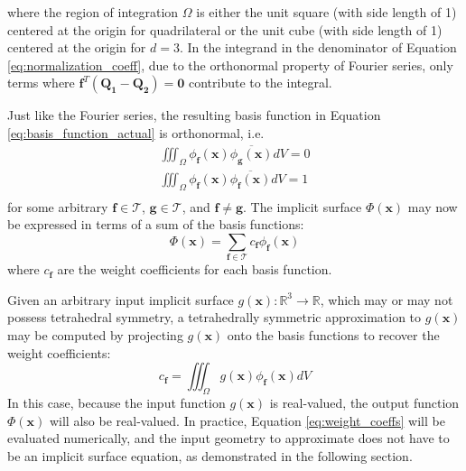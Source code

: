 \documentclass[acmtog]{acmart}
\begin{document}
where the region of integration $\Omega$ is either the unit square (with side length of 1) centered at the origin for quadrilateral  or the unit cube (with side length of 1) centered at the origin for $d = 3$. In the integrand in the denominator of Equation \ref{eq:normalization_coeff}, due to the orthonormal property of Fourier series, only terms where $\mathbf{f}^T (\mathbf{Q_1 - Q_2}) = \mathbf{0}$ contribute to the integral.

Just like the Fourier series, the resulting basis function in Equation \ref{eq:basis_function_actual} is orthonormal, i.e.
%
\begin{equation}
  \begin{split}
    \iiint_{\Omega} \phi_{\mathbf{f}}(\mathbf{x}) \overline{\phi_{\mathbf{g}}(\mathbf{x})} dV = 0 \\
    \iiint_{\Omega} \phi_{\mathbf{f}}(\mathbf{x}) \overline{\phi_{\mathbf{f}}(\mathbf{x})} dV = 1 \\
  \end{split}
\end{equation}
%
for some arbitrary $\mathbf{f} \in \mathcal{T}$, $\mathbf{g} \in \mathcal{T}$, and $\mathbf{f} \neq \mathbf{g}$. The implicit surface $\Phi(\mathbf{x})$ may now be expressed in terms of a sum of the basis functions:
%
\begin{equation}
  \label{eq:symmetric_implicit_surface}
  \Phi(\mathbf{x}) = \sum\limits_{\mathbf{f} \in \mathcal{T}} c_{\mathbf{f}} \phi_{\mathbf{f}}(\mathbf{x})
\end{equation}
%
where $c_{\mathbf{f}}$ are the weight coefficients for each basis function.

Given an arbitrary input implicit surface $g(\mathbf{x}): \mathbb{R}^3 \rightarrow \mathbb{R}$, which may or may not possess tetrahedral symmetry, a tetrahedrally symmetric approximation to $g(\mathbf{x})$ may be computed by projecting $g(\mathbf{x})$ onto the basis functions to recover the weight coefficients:
%
\begin{equation}
  \label{eq:weight_coeffs}
  c_{\mathbf{f}} = \iiint_{\Omega} g(\mathbf{x}) \phi_{\mathbf{f}}(\mathbf{x}) dV
\end{equation}
%
In this case, because the input function $g(\mathbf{x})$ is real-valued, the output function $\Phi(\mathbf{x})$ will also be real-valued. In practice, Equation \ref{eq:weight_coeffs} will be evaluated numerically, and the input geometry to approximate does not have to be an implicit surface equation, as demonstrated in the following section.
\end{document}
